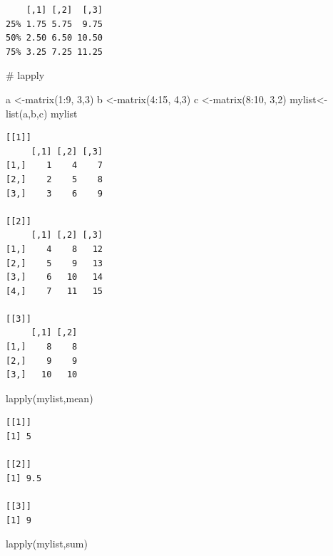 \documentclass[
  letterpaper,
  DIV=11,
  numbers=noendperiod]{scrreprt}
\newenvironment{Shaded}{\begin{snugshade}}{\end{snugshade}}
\newcommand{\CommentTok}[1]{\textcolor[rgb]{0.37,0.37,0.37}{#1}}
\newcommand{\DecValTok}[1]{\textcolor[rgb]{0.68,0.00,0.00}{#1}}
\newcommand{\FunctionTok}[1]{\textcolor[rgb]{0.28,0.35,0.67}{#1}}
\newcommand{\NormalTok}[1]{\textcolor[rgb]{0.00,0.23,0.31}{#1}}
\newcommand{\OtherTok}[1]{\textcolor[rgb]{0.00,0.23,0.31}{#1}}
\newcommand{\SpecialCharTok}[1]{\textcolor[rgb]{0.37,0.37,0.37}{#1}}
\begin{document}
\begin{verbatim}
    [,1] [,2]  [,3]
25% 1.75 5.75  9.75
50% 2.50 6.50 10.50
75% 3.25 7.25 11.25
\end{verbatim}

\begin{Shaded}
\begin{Highlighting}[]
\CommentTok{\# lapply}

\NormalTok{a }\OtherTok{\textless{}{-}}\FunctionTok{matrix}\NormalTok{(}\DecValTok{1}\SpecialCharTok{:}\DecValTok{9}\NormalTok{, }\DecValTok{3}\NormalTok{,}\DecValTok{3}\NormalTok{)}
\NormalTok{b }\OtherTok{\textless{}{-}}\FunctionTok{matrix}\NormalTok{(}\DecValTok{4}\SpecialCharTok{:}\DecValTok{15}\NormalTok{, }\DecValTok{4}\NormalTok{,}\DecValTok{3}\NormalTok{)}
\NormalTok{c }\OtherTok{\textless{}{-}}\FunctionTok{matrix}\NormalTok{(}\DecValTok{8}\SpecialCharTok{:}\DecValTok{10}\NormalTok{, }\DecValTok{3}\NormalTok{,}\DecValTok{2}\NormalTok{)}
\NormalTok{mylist}\OtherTok{\textless{}{-}}\FunctionTok{list}\NormalTok{(a,b,c)}
\NormalTok{mylist}
\end{Highlighting}
\end{Shaded}

\begin{verbatim}
[[1]]
     [,1] [,2] [,3]
[1,]    1    4    7
[2,]    2    5    8
[3,]    3    6    9

[[2]]
     [,1] [,2] [,3]
[1,]    4    8   12
[2,]    5    9   13
[3,]    6   10   14
[4,]    7   11   15

[[3]]
     [,1] [,2]
[1,]    8    8
[2,]    9    9
[3,]   10   10
\end{verbatim}

\begin{Shaded}
\begin{Highlighting}[]
\FunctionTok{lapply}\NormalTok{(mylist,mean)}
\end{Highlighting}
\end{Shaded}

\begin{verbatim}
[[1]]
[1] 5

[[2]]
[1] 9.5

[[3]]
[1] 9
\end{verbatim}

\begin{Shaded}
\begin{Highlighting}[]
\FunctionTok{lapply}\NormalTok{(mylist,sum)}
\end{Highlighting}
\end{Shaded}
\end{document}
